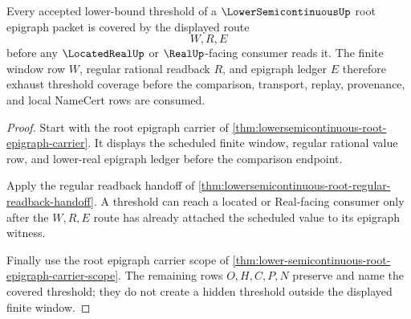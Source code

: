 \begin{theorem}
\label{thm:lowersemicontinuous-root-epigraph-coverage}
Every accepted lower-bound threshold of a $\LowerSemicontinuousUp$ root epigraph packet is covered by the displayed route
$$
W,R,E
$$
before any $\LocatedRealUp$ or $\RealUp$-facing consumer reads it. The finite window row $W$, regular rational readback $R$, and epigraph ledger $E$ therefore exhaust threshold coverage before the comparison, transport, replay, provenance, and local NameCert rows are consumed.
\end{theorem}
\begin{proof}
Start with the root epigraph carrier of \autoref{thm:lowersemicontinuous-root-epigraph-carrier}. It displays the scheduled finite window, regular rational value row, and lower-real epigraph ledger before the comparison endpoint.

Apply the regular readback handoff of \autoref{thm:lowersemicontinuous-root-regular-readback-handoff}. A threshold can reach a located or Real-facing consumer only after the $W,R,E$ route has already attached the scheduled value to its epigraph witness.

Finally use the root epigraph carrier scope of \autoref{thm:lower-semicontinuous-root-epigraph-carrier-scope}. The remaining rows $O,H,C,P,N$ preserve and name the covered threshold; they do not create a hidden threshold outside the displayed finite window.
\end{proof}

